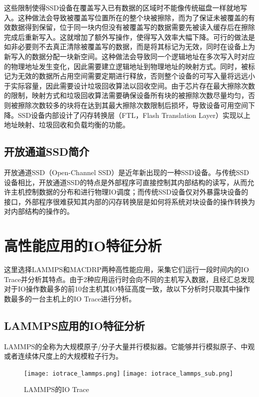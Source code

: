 这些限制使得SSD设备在覆盖写入已有数据的区域时不能像传统磁盘一样就地写入。这种做法会导致被覆盖写位置所在的整个块被擦除，而为了保证未被覆盖的有效数据得到保留，位于同一块内但没有被覆盖写的数据需要先被读入缓存后在擦除完成后重新写入。这就增加了额外写操作，使得写入效率大幅下降。可行的做法是如非必要则不去真正清除被覆盖写的数据，而是将其标记为无效，同时在设备上为新写入的数据分配一块新空间。这种做法会导致同一个逻辑地址在多次写入时对应的物理地址发生变化，因此需要建立逻辑地址到物理地址的映射方式。同时，被标记为无效的数据所占用空间需要定期进行释放，否则整个设备的可写入量将远远小于实际容量，因此需要设计垃圾回收算法以回收空间。由于芯片存在最大擦除次数的限制，映射方式和垃圾回收算法需要确保设备所有块的被擦除次数尽量均匀，否则被擦除次数较多的块将在达到其最大擦除次数限制后损坏，导致设备可用空间下降。SSD设备内部设计了闪存转换层（FTL，Flash Translation Layer）实现以上地址映射、垃圾回收和负载均衡的功能。

\subsection{开放通道SSD简介}
开放通道SSD（Open-Channel SSD）是近年新出现的一种SSD设备。与传统SSD设备相比，开放通道SSD的特点是外部程序可直接控制其内部结构的读写，从而允许主机控制数据的分布和进行物理IO调度；而传统SSD设备仅对外暴露块设备的接口，外部程序很难获知其内部的闪存转换层是如何将系统对块设备的操作转换为对内部结构的操作的。

\section{高性能应用的IO特征分析}
这里选择LAMMPS和MACDRP两种高性能应用，采集它们运行一段时间内的IO Trace并分析其特点。由于2种应用运行时会向不同的主机写入数据，且经汇总发现对于IO操作数最多的前10台主机其IO特征高度一致，故以下分析时只取其中操作数最多的一台主机上的IO Trace进行分析。
\subsection{LAMMPS应用的IO特征分析}
LAMMPS的全称为大规模原子/分子大量并行模拟器。它能够并行模拟原子、中观或者连续体尺度上的大规模粒子行为。

\begin{figure}[H]
  \centering
    {\texttt{[image: iotrace\_lammps.png]}}
  \hspace{4em}
      {\texttt{[image: iotrace\_lammps\_sub.png]}}
  \caption{LAMMPS的IO Trace}
  \label{fig:iotrace_lammps_all}
\end{figure}


